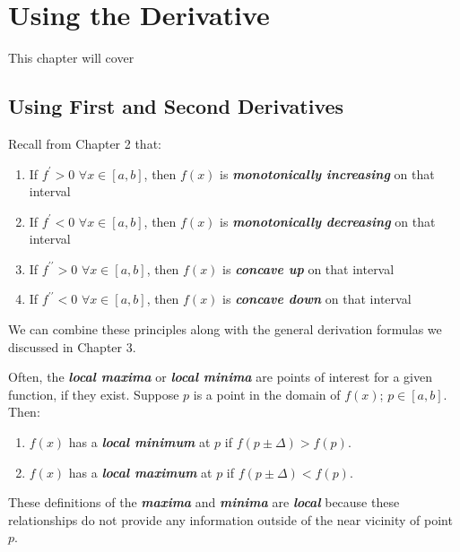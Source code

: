 \chapter{Using the Derivative}
This chapter will cover

\section{Using First and Second Derivatives}
Recall from Chapter 2 that:
%
\begin{enumerate}
\item If $f^\prime > 0$ $\forall x \in [a, b]$, then $f(x)$ is \textbf{\textit{monotonically increasing}} on that interval\\
\item If $f^\prime < 0$ $\forall x \in [a, b]$, then $f(x)$ is \textbf{\textit{monotonically decreasing}} on that interval\\
\item If $f^{\prime\prime} > 0$ $\forall x \in [a, b]$, then $f(x)$ is \textbf{\textit{concave up}} on that interval\\
\item If $f^{\prime\prime} < 0$ $\forall x \in [a, b]$, then $f(x)$ is \textbf{\textit{concave down}} on that interval
\end{enumerate}
%
We can combine these principles along with the general derivation formulas we discussed in Chapter 3.

\vspace{0.1in}
Often, the \textbf{\textit{local maxima}} or \textbf{\textit{local minima}} are points of interest for a given function, if they exist. Suppose $p$ is a point in the domain of $f(x)$; $p \in [a, b]$. Then:
%
\begin{enumerate}
\item $f(x)$ has a \textbf{\textit{local minimum}} at $p$ if $f(p \pm \Delta) > f(p)$.
\item $f(x)$ has a \textbf{\textit{local maximum}} at $p$ if $f(p \pm \Delta) < f(p)$.
\end{enumerate}
%
These definitions of the \textbf{\textit{maxima}} and \textbf{\textit{minima}} are \textbf{\textit{local}} because these relationships do not provide any information outside of the near vicinity of point $p$.

